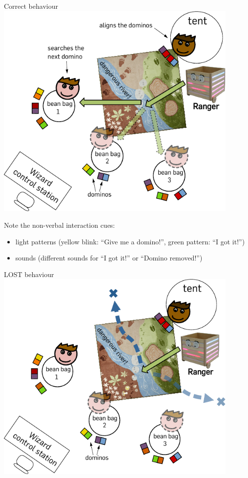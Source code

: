 \documentclass[compress]{beamer}
\begin{document}
\begin{frame}{Correct behaviour}
     {
    \centering
        \includegraphics[width=0.9\textwidth]{domino-setup}
    }
     {
    \centering
    }
     {
        Note the non-verbal interaction cues:
        \begin{itemize}
            \item light patterns (yellow blink: ``Give me a domino!'', green pattern:
                ``I got it!'')
            \item sounds (different sounds for ``I got it!'' or ``Domino removed!'')
        \end{itemize}
    }
\end{frame}

\begin{frame}{LOST behaviour}
    \centering
     {
        \includegraphics[width=0.9\textwidth]{domino-setup-lost}
    }
     {
    }

\end{frame}
\end{document}
